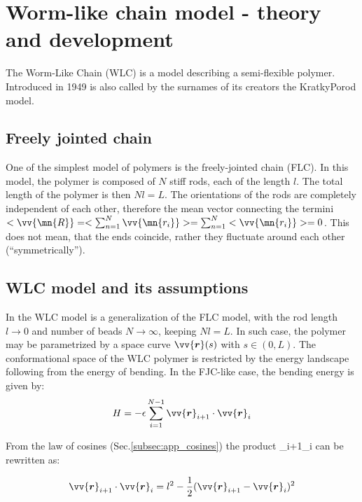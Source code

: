 \documentclass[11pt]{article}
\begin{document}
\section*{Worm-like chain model - theory and development}
\label{sec:WLC}
The Worm-Like Chain (WLC) is a model describing a semi-flexible polymer.
Introduced in 1949\cite{kratky1949rontgenuntersuchung} is also called by the surnames of its creators the Kratky\–Porod model.

\subsection*{Freely jointed chain}
\label{subsec:wlc_flc}
One of the simplest model of polymers is the freely-jointed chain (FLC).
In this model, the polymer is composed of $N$ stiff rods, each of the length $l$.
The total length of the polymer is then $Nl=L$.
The orientations of the rods are completely independent of each other, therefore the mean vector connecting the termini $<\vv{\mn{R}} = <\sum_{n=1}^N \vv{\mn{r_i}}> = \sum_{n=1}^N <\vv{\mn{r_i}}> = 0$.
This does not mean, that the ends coincide, rather they fluctuate around each other (``symmetrically'').

\subsection*{WLC model and its assumptions}
\label{subsec:wlc_assumptions}
In the WLC model is a generalization of the FLC model, with the rod length $l\rightarrow 0$ and number of beads $N\rightarrow\infty$, keeping $Nl=L$.
In such case, the polymer may be parametrized by a space curve $\vv{\bm{r}}(s)$ with $s\in(0,L)$.
The conformational space of the WLC polymer is restricted by the energy landscape following from the energy of bending.
In the FJC-like case, the bending energy is given by:
\begin{equation}
    \label{eq:wlc_assumptions_discrete}
    H = -\epsilon\sum_{i=1}^{N-1}\vv{\bm{r}}_{i+1}\cdot\vv{\bm{r}}_{i}
\end{equation}

From the law of cosines (Sec.\ref{subsec:app_cosines}) the product _{i+1}\cdot{}_{i} can be rewritten as:

\begin{equation}
    \label{eq:wlc_assumptions_cosines}
    \vv{\bm{r}}_{i+1}\cdot\vv{\bm{r}}_{i} = l^2 - \frac{1}{2}(\vv{\bm{r}}_{i+1}-\vv{\bm{r}}_{i})^2
\end{equation}
\end{document}
